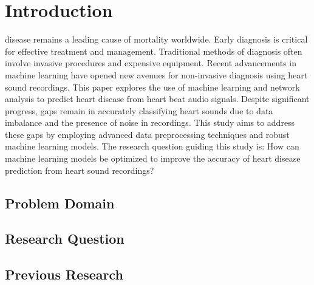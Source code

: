 \section{Introduction}
 disease remains a leading cause of mortality worldwide.
Early diagnosis is critical for effective treatment and management.
Traditional methods of diagnosis often involve invasive procedures and expensive equipment.
Recent advancements in machine learning have opened new avenues for non-invasive diagnosis using heart sound recordings.
This paper explores the use of machine learning and network analysis to predict heart disease from heart beat audio signals.
Despite significant progress, gaps remain in accurately classifying heart sounds due to data imbalance and the presence of noise in recordings.
This study aims to address these gaps by employing advanced data preprocessing techniques and robust machine learning models.
The research question guiding this study is: How can machine learning models be optimized to improve the accuracy of heart disease prediction
from heart sound recordings?

\subsection{Problem Domain}

\subsection{Research Question}

\subsection{Previous Research}

